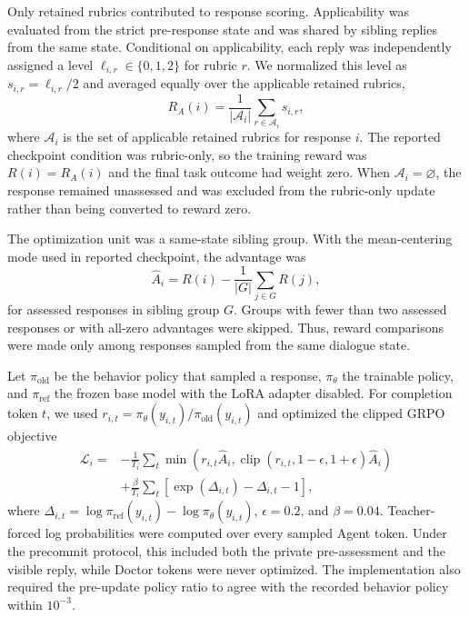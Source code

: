 Only retained rubrics contributed to response scoring.  Applicability was
evaluated from the strict pre-response state and was shared by sibling replies
from the same state.  Conditional on applicability, each reply was independently
assigned a level $\ell_{i,r}\in\{0,1,2\}$ for rubric $r$.  We normalized this
level as $s_{i,r}=\ell_{i,r}/2$ and averaged equally over the applicable retained
rubrics,
\begin{equation}
R_A(i)=\frac{1}{|\mathcal{A}_i|}\sum_{r\in\mathcal{A}_i}s_{i,r},
\end{equation}
where $\mathcal{A}_i$ is the set of applicable retained rubrics for response
$i$.  The reported checkpoint condition was rubric-only, so the training reward was
$R(i)=R_A(i)$ and the final task outcome had weight zero.  When
$\mathcal{A}_i=\varnothing$, the response remained unassessed and was excluded
from the rubric-only update rather than being converted to reward zero.

The optimization unit was a same-state sibling group.  With the mean-centering
mode used in reported checkpoint, the advantage was
\begin{equation}
\hat A_i = R(i)-\frac{1}{|G|}\sum_{j\in G}R(j),
\end{equation}
for assessed responses in sibling group $G$.  Groups with fewer than two
assessed responses or with all-zero advantages were skipped.  Thus, reward
comparisons were made only among responses sampled from the same dialogue state.

Let $\pi_{\mathrm{old}}$ be the behavior policy that sampled a response,
$\pi_\theta$ the trainable policy, and $\pi_{\mathrm{ref}}$ the frozen base
model with the LoRA adapter disabled.  For completion token $t$, we used
$r_{i,t}=\pi_\theta(y_{i,t})/\pi_{\mathrm{old}}(y_{i,t})$ and optimized the
clipped GRPO objective
\begin{align}
\mathcal{L}_{i} ={}& -\frac{1}{T_i}\sum_t
\min\!\left(r_{i,t}\hat A_i,
\operatorname{clip}(r_{i,t},1-\epsilon,1+\epsilon)\hat A_i\right) \\
&+\frac{\beta}{T_i}\sum_t
\left[\exp(\Delta_{i,t})-\Delta_{i,t}-1\right],
\end{align}
where $\Delta_{i,t}=\log\pi_{\mathrm{ref}}(y_{i,t})-
\log\pi_\theta(y_{i,t})$, $\epsilon=0.2$, and $\beta=0.04$.
Teacher-forced log probabilities were computed over every sampled Agent token.
Under the precommit protocol, this included both the private pre-assessment and
the visible reply, while Doctor tokens were never optimized.  The implementation
also required the pre-update policy ratio to agree with the recorded behavior
policy within $10^{-3}$.

